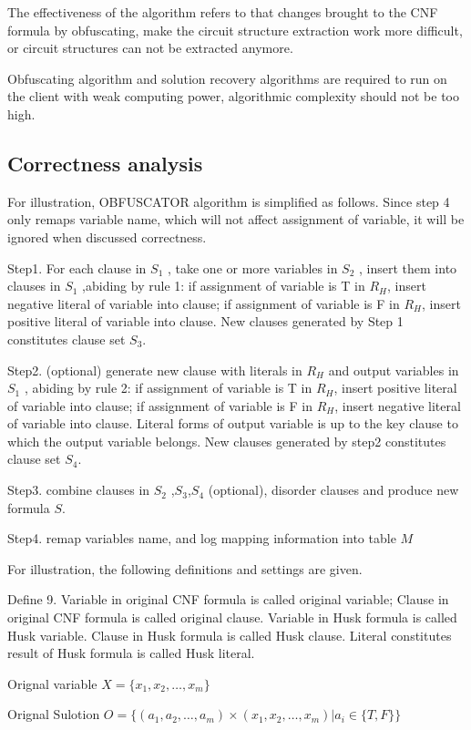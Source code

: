 \documentclass[runningheads,a4paper]{llncs}
\begin{document}
The effectiveness of the algorithm refers to that changes brought to the CNF formula by obfuscating, make the circuit structure extraction work more difficult, 
or circuit structures can not be extracted anymore. 

Obfuscating algorithm and solution recovery algorithms are required to run on the client with weak computing power, algorithmic complexity should not be too high.
\subsection{Correctness analysis}

For illustration, OBFUSCATOR algorithm is simplified as follows. Since step 4 only remaps variable name, which will not affect assignment of variable, 
it will be ignored when discussed correctness.

Step1. For each clause in $S_1$  , take one or more variables in $S_2$ , insert them into clauses in $S_1$ ,abiding by rule 1:
if assignment of variable is T in $R_H$, insert negative literal of variable into clause;
if assignment of variable is F in $R_H$, insert positive literal of variable into clause. 
New clauses generated by Step 1 constitutes clause set $S_3$.

Step2. (optional) generate new clause with literals in $R_H$ and output variables in $S_1$ , abiding by rule 2: 
if assignment of variable is T in $R_H$, insert positive literal of variable into clause;
if assignment of variable is F in $R_H$, insert negative literal of variable into clause.
Literal forms of output variable is up to the key clause to which the output variable belongs. 
New clauses generated by step2 constitutes clause set $S_4$.

Step3. combine clauses in $S_2$ ,$S_3$,$S_4$ (optional), disorder clauses and produce new formula $S$.

Step4. remap variables name, and log mapping information into table $M$ 

For illustration, the following definitions and settings are given.

\noindent Define 9. Variable in original CNF formula is called original variable; Clause in original CNF formula is called original clause. Variable in Husk formula is called Husk variable. Clause in Husk formula is called Husk clause. Literal constitutes result of Husk formula is called Husk literal.

Orignal variable	$X=\{x_1,x_2,\dots,x_m\}$

Orignal Sulotion	$O=\{(a_1,a_2,\dots,a_m)\times(x_1,x_2,\dots,x_m) | a_i∈ \{T,F\}\}$
\end{document}
